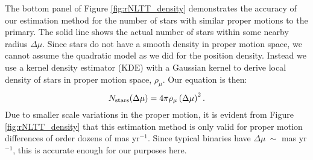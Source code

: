 \documentclass[usenatbib]{mnras}
\begin{document}
The bottom panel of Figure \ref{fig:rNLTT_density} demonstrates the accuracy of our estimation method for the number of stars with similar proper motions to the primary. The solid line shows the actual number of stars within some nearby radius $\Delta \mu$. Since stars do not have a smooth density in proper motion space, we cannot assume the quadratic model as we did for the position density. Instead we use a kernel density estimator (KDE) with a Gaussian kernel to derive local density of stars in proper motion space, $\rho_{\mu}$. Our equation is then:
\begin{equation}
N_{\rm stars}(\Delta \mu) = 4 \pi \rho_{\mu} \left(\Delta \mu\right)^2.
\end{equation}
Due to smaller scale variations in the proper motion, it is evident from Figure \ref{fig:rNLTT_density} that this estimation method is only valid for proper motion differences of order dozens of mas yr$^{-1}$. Since typical binaries have $\Delta \mu\ \sim$ mas yr$^{-1}$, this is accurate enough for our purposes here.
\end{document}
